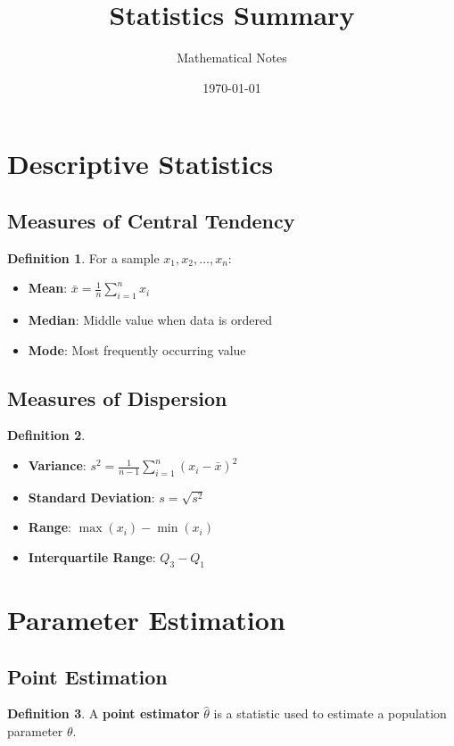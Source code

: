 \documentclass[11pt]{article}
\title{Statistics Summary}
\author{Mathematical Notes}
\date{\today}
\theoremstyle{definition}
\newtheorem{definition}{Definition}[section]
\begin{document}
\maketitle

\tableofcontents
\newpage

\section{Descriptive Statistics}

\subsection{Measures of Central Tendency}
\begin{definition}
For a sample $x_1, x_2, \ldots, x_n$:
\begin{itemize}
    \item \textbf{Mean}: $\bar{x} = \frac{1}{n}\sum_{i=1}^n x_i$
    \item \textbf{Median}: Middle value when data is ordered
    \item \textbf{Mode}: Most frequently occurring value
\end{itemize}
\end{definition}

\subsection{Measures of Dispersion}
\begin{definition}
\begin{itemize}
    \item \textbf{Variance}: $s^2 = \frac{1}{n-1}\sum_{i=1}^n (x_i - \bar{x})^2$
    \item \textbf{Standard Deviation}: $s = \sqrt{s^2}$
    \item \textbf{Range}: $\max(x_i) - \min(x_i)$
    \item \textbf{Interquartile Range}: $Q_3 - Q_1$
\end{itemize}
\end{definition}

\section{Parameter Estimation}

\subsection{Point Estimation}
\begin{definition}
A \textbf{point estimator} $\hat{\theta}$ is a statistic used to estimate a population parameter $\theta$.
\end{definition}
\end{document}
